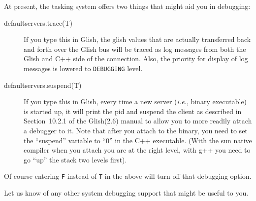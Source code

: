 At present, the tasking system offers two things that might aid you in
debugging:
\begin{description}
    \item[defaultservers.trace(T)]
    If you type this in Glish, the glish values that are actually
    transferred back and forth over the Glish bus will be traced as
    log messages from both the Glish and C++ side of the connection.
    Also, the priority for display of log messages is lowered to 
    {\tt DEBUGGING} level. 

    \item[defaultservers.suspend(T)]
    If you type this in Glish, every time a new server ({\em i.e.}, binary
    executable) is started up, it will print the pid and suspend the
    client as described in Section~10.2.1 of the Glish(2.6) manual to
    allow you to more readily attach a debugger to it. Note that after
    you attach to the binary, you need to set the ``suspend'' variable
    to ``0'' in the C++ executable. (With the sun native compiler when you
    attach you are at the right level, with g++ you need to go ``up''
    the stack two levels first).
\end{description}
Of course entering {\tt F} instead of {\tt T} in the above will turn
off that debugging option.
    
Let us know of any other system debugging support that might be useful
to you.

